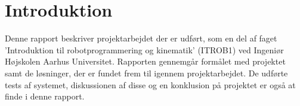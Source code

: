 \clearpage
\section{Introduktion}

Denne rapport beskriver projektarbejdet der er udført, som en del af faget 'Introduktion til robotprogrammering og kinematik' (ITROB1) ved Ingeniør Højskolen Aarhus Universitet.
Rapporten gennemgår formålet med projektet samt de løsninger, der er fundet frem til igennem projektarbejdet.
De udførte tests af systemet, diskussionen af disse og en konklusion på projektet er også at finde i denne rapport.



